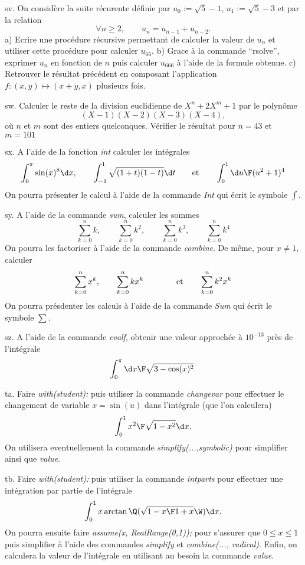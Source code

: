 \exo [Level=1,Fight=1,Learn=1,Field=\RécurrencesLinéaires,Type=\Maple,Origin=] sv. 
On considère la suite récurente définie par $u_0:=\sqrt5-1$, $u_1:=\sqrt5-3$ et par la relation 
$$
\forall n\ge2, \qquad u_n=u_{n-1}+u_{n-2}.
$$
a) Ecrire une procédure récursive permettant de calculer la valeur de $u_n$ et utiliser cette procédure pour calculer $u_{66}$. \pn
b) Grace à la commande ``rsolve'', exprimer $u_n$ en fonction de $n$ puis calculer $u_{666}$ à l'aide de la formule obtenue. \pn
c) Retrouver le résultat précédent en composant  l'application $f:(x,y)\mapsto(x+y,x)$ plusieurs fois. 

\exo [Level=1,Fight=1,Learn=1,Field=\Polynômes,Type=\Exercices,Origin=] sw. 
Calculer le reste de la division euclidienne de $X^n+2X^m+1$ par le polynôme 
$$
(X-1)(X-2)(X-3)(X-4), 
$$
où $n$ et $m$ sont des entiers quelconques. 
Vérifier le résultat pour $n=43$ et $m=101$

\exo [Level=1,Fight=1,Learn=1,Field=\Intégration,Type=\Maple,Origin=] sx. 
A l'aide de la fonction {\it int} calculer les intégrales
$$
\int_0^\pi\sin(x)^8\d x, \qquad \int_{-1}^1\sqrt{(1+t)(1-t)}\d t\qquad\hbox{et}\qquad \int_0^1{\d u\F(u^2+1)^4}
$$
On pourra présenter le calcul à l'aide de la commande {\it Int} qui écrit le symbole $\int$. 

\exo [Level=1,Fight=1,Learn=1,Field=\Polynômes,Type=\Maple,Origin=] sy. 
A l'aide de la commande {\it sum}, calculer les sommes
$$
\sum_{k=0}^nk, \qquad \sum_{k=0}^nk^2, \qquad \sum_{k=0}^nk^3, \qquad \sum_{k=0}^nk^4
$$
On pourra les factoriser à l'aide de la commande {\it combine}. De même, pour $x\neq1$, calculer 
$$
\sum_{k=0}^nx^k, \qquad \sum_{k=0}^nkx^k\qquad \qquad\hbox{et}\qquad \sum_{k=0}^nk^2x^k
$$
On pourra présdenter les calculs à l'aide de la commande {\it Sum} qui écrit le symbole $\sum$.  

\exo [Level=1,Fight=1,Learn=1,Field=\Polynômes,Type=\Maple,Origin=]  sz. 
A l'aide de la commande {\it evalf}, obtenir une valeur approchée à $10^{-13}$ près de l'intégrale 
$$
\int_0^\pi{\d x\F\sqrt{3-\cos(x)^2}}.
$$

\exo [Level=1,Fight=0,Learn=0,Field=\Intégration,Type=\Maple,Origin=] ta. 
Faire {\it with(student):} puis utiliser la commande {\it changevar} pour effectuer le changement de variable $x=\sin(u)$ dans l'intégrale (que l'on calculera)  
$$
\int_0^1{x^2\F\sqrt{1-x^2}}\d x. 
$$
On utilisera eventuellement la commande {\it simplify(...,symbolic)} pour simplifier ainsi que  {\it value}. 

\exo  [Level=1,Fight=1,Learn=1,Field=\Intégration,Type=\Maple,Origin=] tb. 
Faire {\it with(student):} puis utiliser la commande {\it intparts} pour effectuer une intégration par partie de l'intégrale 
$$
\int_0^1x\arctan\Q(\sqrt{1-x\F1+x}\W)\d x. 
$$
On pourra ensuite faire {\it assume(x, RealRange(0,1));} pour s'assurer que $0\le x\le 1$ puis simplifier à l'aide des commandes  {\it simplify} et {\it combine(..., radical)}. Enfin, on calculera la valeur de l'intégrale en utilisant au besoin la commande {\it value}. 

